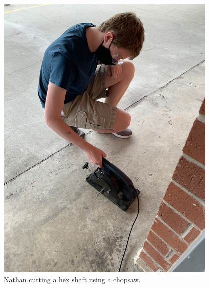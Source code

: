 \begin{figure}[htp]
\centering
  \includegraphics[width=0.95\textwidth]{Meetings/September/09-28-21/9-28-21_Hardware_Image5 - Nathan Forrer.jpg}
  \caption{Nathan cutting a hex shaft using a chopsaw.}
  \label{fig:pic5}
\end{figure}